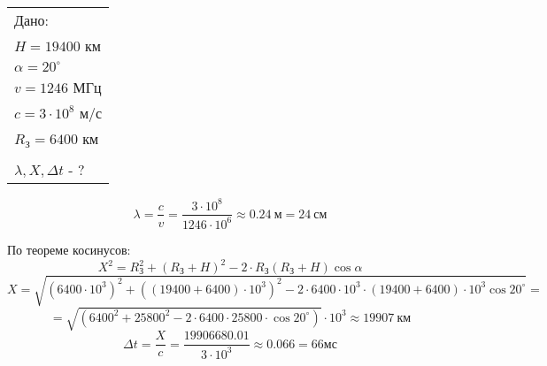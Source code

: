 \solutionSection

\begin{tabular}{l|}
    Дано: \\
    $H = 19400$ км \\
    $\alpha = 20^\circ$ \\
    $v = 1246$ МГц \\
    $c = 3 \cdot 10^8$ м/с \\
    $R_\text{З} = 6400$ км \\
    \hline \\
    $\lambda, X, \Delta t $ - ?
\end{tabular}

$$\lambda = \frac{c}{v} = \frac{3 \cdot 10^8}{1246 \cdot 10^6} \approx 0.24 \: \text{м} = 24 \: \text{см}$$

По теореме косинусов:
$$X^2 = R^2_\text{З} + (R_\text{З} + H)^2 - 2 \cdot R_\text{З}(R_\text{З} + H) \cos \alpha$$
$$X = \sqrt{(6400 \cdot 10^3)^2 + \left( (19400 + 6400) \cdot 10^3 \right)^2 - 2 \cdot 6400 \cdot 10^3 \cdot (19400+6400)\cdot 10^3 \cos 20^\circ} =$$
$$=\sqrt{(6400^2+25800^2-2\cdot 6400\cdot 25800\cdot \cos 20^\circ)} \cdot 10^3 \approx 19907 \: \text{км}$$
$$\Delta t = \frac{X}{c} = \frac{19906680.01}{3\cdot 10^3} \approx 0.066 = 66 \text{мс}$$


